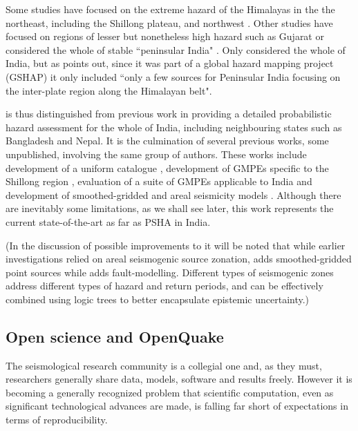 \documentclass{article}
\begin{document}
Some studies have focused on the extreme hazard of the Himalayas \citep{Bilham2001} in the the northeast, including the Shillong plateau, \citep{Das2006} and northwest \citep{Mahajan2009}. Other studies have focused on regions of lesser but nonetheless high hazard such as Gujarat \citep{Yadav2008} or considered the whole of stable ``peninsular India" \citep{jaiswal2007, ashish2016probabilistic}. Only \cite{bhatia1999probabilistic} considered the whole of India, but as \cite{ashish2016probabilistic} points out, since it was part of a global hazard mapping project (GSHAP) it only included ``only a few sources for Peninsular India focusing on the inter-plate
region along the Himalayan belt".   

\cite{nath2012probabilistic} is thus distinguished from previous work in providing a detailed probabilistic hazard assessment for the whole of India, including neighbouring states such as Bangladesh and Nepal. It is the culmination of several previous works, some unpublished, involving the same group of authors. These works include development of a uniform catalogue \citep{nath2010earthquake}, development of GMPEs specific to the Shillong region \citep{nath2012ground}, evaluation of a suite of GMPEs applicable to India \citep{nath2011peak} and development of smoothed-gridded and areal seismicity models \citep{thingbaijam2011seismogenic}. Although there are inevitably some limitations, as we shall see later, this work represents the current state-of-the-art as far as PSHA in India.

(In the discussion of possible improvements to \cite{nath2012probabilistic} it will be noted that while earlier investigations \citep{bhatia1999probabilistic, Das2006, Yadav2008, jaiswal2007} relied on areal seismogenic source zonation, \cite{nath2012probabilistic} adds smoothed-gridded point sources while \cite{ashish2016probabilistic} adds fault-modelling. Different types of seismogenic zones address different types of hazard and return periods, and can be effectively combined using logic trees to better encapsulate epistemic uncertainty.)

\subsection{Open science and OpenQuake}
\label{subsec:Open}

The seismological research community is a collegial one and, as they must, researchers generally share data, models, software and results freely. However it is becoming a generally recognized problem that scientific computation, even as significant technological advances are made, is falling far short of expectations in terms of reproducibility.
\end{document}
